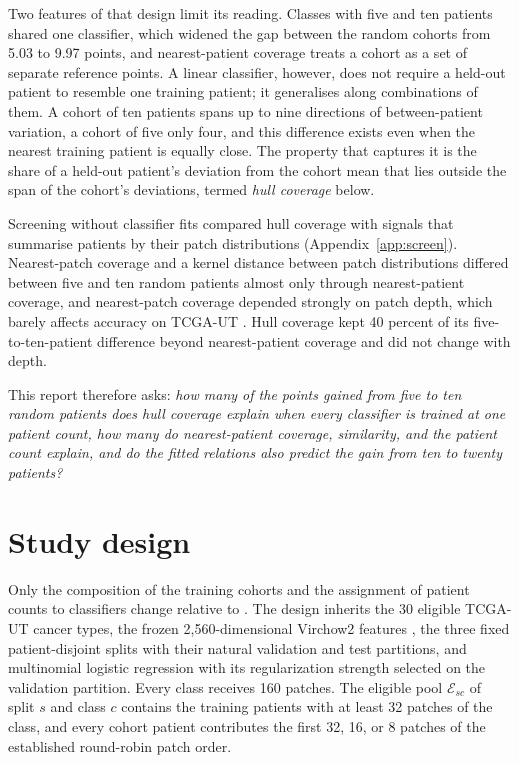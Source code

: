 \documentclass[11pt]{article}
\begin{document}
Two features of that design limit its reading. Classes with five and ten patients shared one classifier, which widened the gap between the random cohorts from 5.03 to 9.97 points, and nearest-patient coverage treats a cohort as a set of separate reference points. A linear classifier, however, does not require a held-out patient to resemble one training patient; it generalises along combinations of them. A cohort of ten patients spans up to nine directions of between-patient variation, a cohort of five only four, and this difference exists even when the nearest training patient is equally close. The property that captures it is the share of a held-out patient's deviation from the cohort mean that lies outside the span of the cohort's deviations, termed \emph{hull coverage} below.

Screening without classifier fits compared hull coverage with signals that summarise patients by their patch distributions (Appendix~\ref{app:screen}). Nearest-patch coverage and a kernel distance between patch distributions differed between five and ten random patients almost only through nearest-patient coverage, and nearest-patch coverage depended strongly on patch depth, which barely affects accuracy on TCGA-UT \citep{queisler2026effectiveSupport}. Hull coverage kept 40 percent of its five-to-ten-patient difference beyond nearest-patient coverage and did not change with depth.

This report therefore asks: \emph{how many of the points gained from five to ten random patients does hull coverage explain when every classifier is trained at one patient count, how many do nearest-patient coverage, similarity, and the patient count explain, and do the fitted relations also predict the gain from ten to twenty patients?}

\section{Study design}
\label{sec:design}
Only the composition of the training cohorts and the assignment of patient counts to classifiers change relative to \citet{queisler2026shortageDecomposition}. The design inherits the 30 eligible TCGA-UT cancer types, the frozen 2,560-dimensional Virchow2 features \citep{zimmermann2024virchow2}, the three fixed patient-disjoint splits with their natural validation and test partitions, and multinomial logistic regression with its regularization strength selected on the validation partition. Every class receives 160 patches. The eligible pool $\mathcal E_{sc}$ of split $s$ and class $c$ contains the training patients with at least 32 patches of the class, and every cohort patient contributes the first 32, 16, or 8 patches of the established round-robin patch order.
\end{document}

